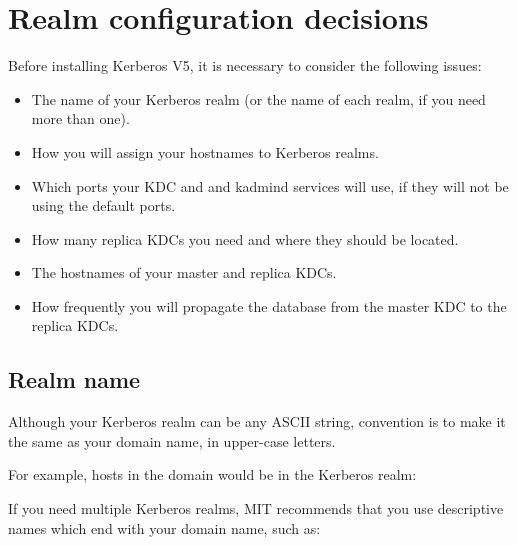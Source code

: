 \documentclass[letterpaper,10pt,english]{sphinxmanual}
\begin{document}
\chapter{Realm configuration decisions}
\label{\detokenize{admin/realm_config:realm-configuration-decisions}}\label{\detokenize{admin/realm_config::doc}}
Before installing Kerberos V5, it is necessary to consider the
following issues:
\begin{itemize}
\item {} 
The name of your Kerberos realm (or the name of each realm, if you
need more than one).

\item {} 
How you will assign your hostnames to Kerberos realms.

\item {} 
Which ports your KDC and and kadmind services will use, if they will
not be using the default ports.

\item {} 
How many replica KDCs you need and where they should be located.

\item {} 
The hostnames of your master and replica KDCs.

\item {} 
How frequently you will propagate the database from the master KDC
to the replica KDCs.

\end{itemize}


\section{Realm name}
\label{\detokenize{admin/realm_config:realm-name}}
Although your Kerberos realm can be any ASCII string, convention is to
make it the same as your domain name, in upper-case letters.

For example, hosts in the domain  would be in the
Kerberos realm:

%
\begin{sphinxVerbatim}[commandchars=\\\{\}]
\end{sphinxVerbatim}

If you need multiple Kerberos realms, MIT recommends that you use
descriptive names which end with your domain name, such as:

%
\begin{sphinxVerbatim}[commandchars=\\\{\}]
\end{sphinxVerbatim}
\end{document}
